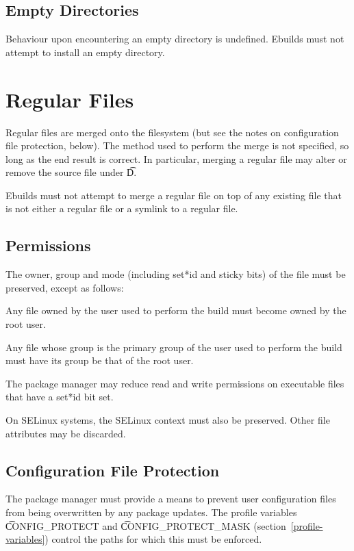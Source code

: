 \subsection{Empty Directories}

Behaviour upon encountering an empty directory is undefined. Ebuilds must not attempt to install an
empty directory.

\section{Regular Files}

Regular files are merged onto the filesystem (but see the notes on configuration file protection,
below). The method used to perform the merge is not specified, so long as the end result is correct.
In particular, merging a regular file may alter or remove the source file under \t{D}.

Ebuilds must not attempt to merge a regular file on top of any existing file that is not either a
regular file or a symlink to a regular file.

\subsection{Permissions}

The owner, group and mode (including set*id and sticky bits) of the file must be preserved, except
as follows:

\begin{compactitem}
\item Any file owned by the user used to perform the build must become owned by the root user.
\item Any file whose group is the primary group of the user used to perform the build must have
    its group be that of the root user.
\item The package manager may reduce read and write permissions on executable files that have a
    set*id bit set.
\end{compactitem}

On SELinux systems, the SELinux context must also be preserved. Other file attributes may be discarded.

\subsection{Configuration File Protection}
\label{config-protect}

The package manager must provide a means to prevent user configuration files from being
overwritten by any package updates. The profile variables \t{CONFIG\_PROTECT} and
\t{CONFIG\_PROTECT\_MASK} (section~\ref{profile-variables}) control the paths for which this
must be enforced.

